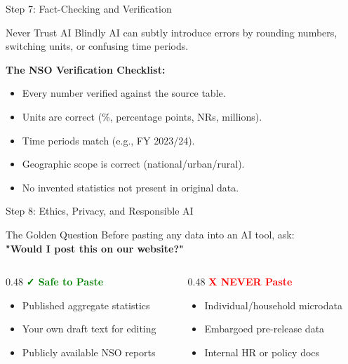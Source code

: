 \documentclass[aspectratio=169]{beamer}
\begin{document}
\begin{frame}{Step 7: Fact-Checking and Verification}
    \begin{alertblock}{Never Trust AI Blindly}
        AI can subtly introduce errors by rounding numbers, switching units, or confusing time periods.
    \end{alertblock}
    
    \vspace{0.3cm}
    \textbf{The NSO Verification Checklist:}
    \begin{itemize}
        \item [\checkmark] Every number verified against the source table.
        \item [\checkmark] Units are correct (\%, percentage points, NRs, millions).
        \item [\checkmark] Time periods match (e.g., FY 2023/24).
        \item [\checkmark] Geographic scope is correct (national/urban/rural).
        \item [\checkmark] No invented statistics not present in original data.
    \end{itemize}
\end{frame}

\begin{frame}{Step 8: Ethics, Privacy, and Responsible AI}
    \begin{block}{The Golden Question}
        Before pasting any data into an AI tool, ask: \\
        \textbf{"Would I post this on our website?"}
    \end{block}
    
    \vspace{0.5cm}
    \begin{columns}[T]
        \begin{column}{0.48\textwidth}
            \textcolor{green}{\textbf{✓ Safe to Paste}}
            \begin{itemize}
                \item Published aggregate statistics
                \item Your own draft text for editing
                \item Publicly available NSO reports
            \end{itemize}
        \end{column}
        
        \begin{column}{0.48\textwidth}
            \textcolor{red}{\textbf{X NEVER Paste}}
            \begin{itemize}
                \item Individual/household microdata
                \item Embargoed pre-release data
                \item Internal HR or policy docs
            \end{itemize}
        \end{column}
    \end{columns}
\end{frame}
\end{document}
